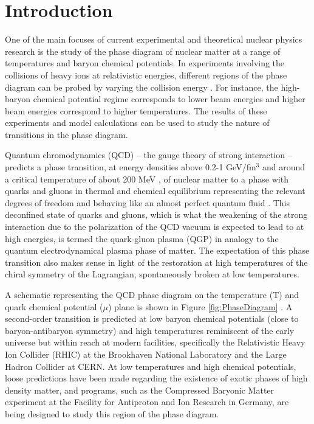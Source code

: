 \chapter{Introduction} \label{ch:introduction}

One of the main focuses of current experimental and theoretical nuclear physics research is the study of the phase diagram of nuclear matter at a range of temperatures and baryon chemical potentials. In experiments involving the collisions of heavy ions at relativistic energies, different regions of the phase diagram can be probed by varying the collision energy \cite{Adare:2015bua}. For instance, the high-baryon chemical potential regime corresponds to lower beam energies and higher beam energies correspond to higher temperatures. The results of these experiments and model calculations can be used to study the nature of transitions in the phase diagram.

Quantum chromodynamics (QCD) -- the gauge theory of strong interaction \cite{KAPUSTA1979461, Shuryak1988} -- predicts a phase transition, at energy densities above 0.2-1 GeV/fm$^{3}$ \cite{Adam:2139456} and around a critical temperature of about 200 MeV \cite{2013arXiv1304.1452M}, of nuclear matter to a phase with quarks and gluons in thermal and chemical equilibrium representing the relevant degrees of freedom and behaving like an almost perfect quantum fluid \cite{PhysRevLett.109.152303}. This deconfined state of quarks and gluons, which is what the weakening of the strong interaction due to the polarization of the QCD vacuum is expected to lead to at high energies, is termed the quark-gluon plasma (QGP) in analogy to the quantum electrodynamical plasma phase of matter. The expectation of this phase transition also makes sense in light of the restoration at high temperatures of the chiral symmetry of the Lagrangian, spontaneously broken at low temperatures.

A schematic representing the QCD phase diagram on the temperature (T) and quark chemical potential ($\mu$) plane is shown in Figure \ref{fig:PhaseDiagram} \cite{1742-6596-761-1-012066}. A second-order transition is predicted at low baryon chemical potentials (close to baryon-antibaryon symmetry) and high temperatures reminiscent of the early universe but within reach at modern facilities, specifically the Relativistic Heavy Ion Collider (RHIC) at the Brookhaven National Laboratory and the Large Hadron Collider at CERN. At low temperatures and high chemical potentials, loose predictions have been made regarding the existence of exotic phases of high density matter, and programs, such as the Compressed Baryonic Matter experiment at the Facility for Antiproton and Ion Research in Germany, are being designed to study this region of the phase diagram.

